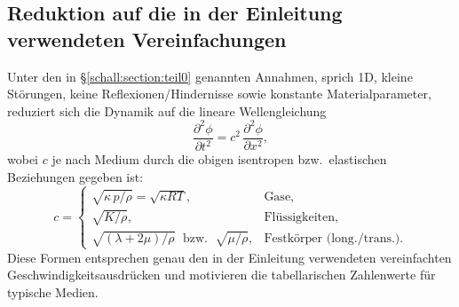 \begin{comment}
\paragraph{Interpretation}
\begin{itemize}
  \item $c_L$ hängt von \emph{Volumensteifigkeit} ab: $(\lambda+2\mu)$ skaliert den Widerstand gegen Volumenänderung (\emph{Druck-/Kompressionswelle}).
  \item $c_T$ hängt allein von der \emph{Schersteifigkeit} $\mu$ ab (\emph{Scherwelle}); in Fluiden ist $\mu\approx 0$, daher keine Transversalwellen.
\end{itemize}

Somit erhält man in isotropen Medien zwei Wellengeschwindigkeiten \cite{schall:landaulifschitz,schall:gurtin}:
\begin{align}
    \boxed{\,c_T=\sqrt{\frac{\mu}{\rho}}=\sqrt{\frac{G}{\rho}}\,} \quad &\text{(transversal, Scherwellen)},\\[2mm]
    \boxed{\,c_L=\sqrt{\frac{\lambda+2\mu}{\rho}}\,} \quad &\text{(longitudinal, Druckwellen)}.
\end{align}
In technischen Materialparametern, sprich Elastizitätsmodul $E$ und Poissonzahl $\nu$, mit
\[
    \mu=G=\frac{E}{2(1+\nu)},
    \qquad
    \lambda=\frac{E\,\nu}{(1+\nu)(1-2\nu)},
\]
ergeben sich die in der Einleitung verwendeten Ausdrücke
\begin{align}
    \boxed{\,c_{s,\mathrm{long}}
    = \sqrt{\frac{E(1-\nu)}{\rho(1+\nu)(1-2\nu)}}\,},\qquad
    \boxed{\,c_{s,\mathrm{trans}}
    = \sqrt{\frac{E}{2\rho(1+\nu)}}=\sqrt{\frac{G}{\rho}}\,}.
\end{align}
Typisch ist $c_L>c_T$, und beide liegen deutlich über Gas- und Flüssigkeitswerten (z.\,B. Stahl $c\approx 5{,}0\text{--}5{,}9\,\mathrm{km/s}$ für Longitudinalwellen, je nach Legierung).

\end{comment}

\subsection{Reduktion auf die in der Einleitung verwendeten Vereinfachungen}
Unter den in \S\ref{schall:section:teil0} genannten Annahmen, sprich 1D,
kleine Störungen, keine Reflexionen/Hindernisse sowie konstante
Materialparameter, reduziert sich die Dynamik auf die lineare
Wellengleichung
\[
    \frac{\partial^2 \phi}{\partial t^2}=c^2\,\frac{\partial^2 \phi}{\partial x^2},
\]
wobei $c$ je nach Medium durch die obigen isentropen bzw.\ elastischen
Beziehungen gegeben ist:
\[
    c=\begin{cases}
    \sqrt{\kappa\,p/\rho}=\sqrt{\kappa R T}, & \text{Gase},\\[1mm]
    \sqrt{K/\rho}, & \text{Flüssigkeiten},\\[1mm]
    \sqrt{(\lambda+2\mu)/\rho}\;\text{ bzw. }\;\sqrt{\mu/\rho}, & \text{Festkörper (long./trans.)}.
\end{cases}
\]
Diese Formen entsprechen genau den in der Einleitung verwendeten
vereinfachten Geschwindigkeitsausdrücken und motivieren die
tabellarischen Zahlenwerte für typische Medien.
